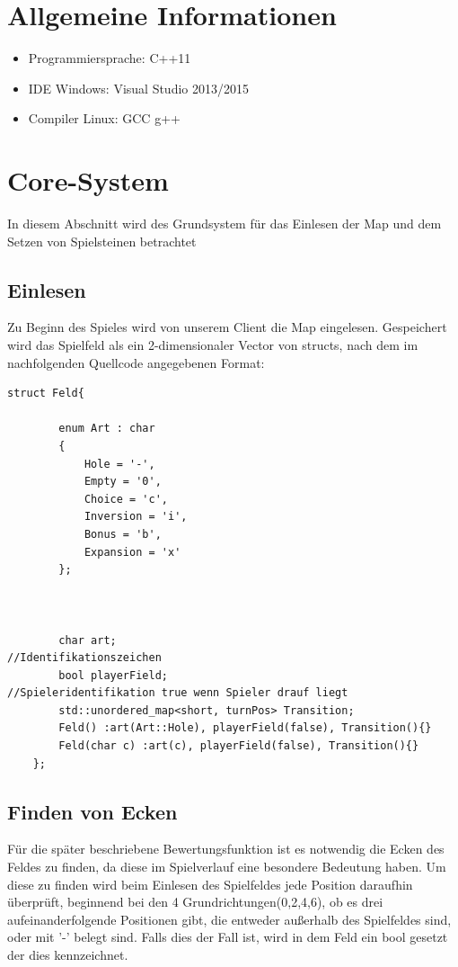 \documentclass[12pt,a4paper,bibliography=totocnumbered,listof=totocnumbered]{scrartcl}
\begin{document}
\section{Allgemeine Informationen}
\begin{itemize}
\item Programmiersprache: C++11
\item IDE Windows: Visual Studio 2013/2015
\item Compiler Linux: GCC g++
\end{itemize}

\section{Core-System}
In diesem Abschnitt wird des Grundsystem für das Einlesen der Map und dem Setzen von Spielsteinen betrachtet

\subsection{Einlesen}
Zu Beginn des Spieles wird von unserem Client die Map eingelesen.
Gespeichert wird das Spielfeld als ein 2-dimensionaler Vector von structs, nach dem im nachfolgenden Quellcode angegebenen Format:


\vspace{1em}
\begin{lstlisting}[caption=Feld, label=lst:Feld.h]
struct Feld{

		enum Art : char
		{
			Hole = '-',
			Empty = '0',
			Choice = 'c',
			Inversion = 'i',
			Bonus = 'b',
			Expansion = 'x'
		};


		
		char art;														//Identifikationszeichen
		bool playerField;												//Spieleridentifikation true wenn Spieler drauf liegt
		std::unordered_map<short, turnPos> Transition;
		Feld() :art(Art::Hole), playerField(false), Transition(){}
		Feld(char c) :art(c), playerField(false), Transition(){}
	};
\end{lstlisting}
\pagebreak

\subsection{Finden von Ecken}
Für die später beschriebene Bewertungsfunktion ist es notwendig die Ecken des Feldes zu finden, da diese im Spielverlauf eine besondere Bedeutung haben.
Um diese zu finden wird beim Einlesen des Spielfeldes jede Position daraufhin überprüft,  beginnend bei den 4 Grundrichtungen(0,2,4,6), ob es drei aufeinanderfolgende Positionen gibt, die entweder außerhalb des Spielfeldes sind, oder mit '-' belegt sind. Falls dies der Fall ist, wird in dem Feld ein bool gesetzt der dies kennzeichnet.
\end{document}
